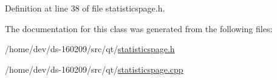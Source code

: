 Definition at line 38 of file statisticspage.\+h.



The documentation for this class was generated from the following files\+:\begin{DoxyCompactItemize}
\item 
/home/dev/ds-\/160209/src/qt/\hyperlink{statisticspage_8h}{statisticspage.\+h}\item 
/home/dev/ds-\/160209/src/qt/\hyperlink{statisticspage_8cpp}{statisticspage.\+cpp}\end{DoxyCompactItemize}
